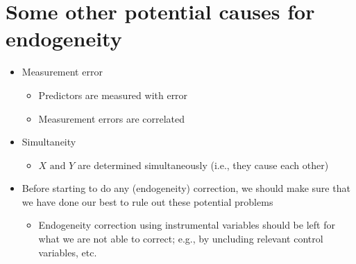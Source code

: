 \documentclass[10pt]{article}
\begin{document}
\section{Some other potential causes for endogeneity}
\begin{itemize}
    \item Measurement error
    \begin{itemize}
        \item Predictors are measured with error 
        \item Measurement errors are correlated 
    \end{itemize}
    \item Simultaneity
    \begin{itemize}
        \item $X \text{ and } Y $ are determined simultaneously (i.e., they cause each other)
    \end{itemize}
    \item Before starting to do any (endogeneity) correction, we should make sure that we have done our best to rule out these potential problems 
    \begin{itemize}
        \item Endogeneity correction using instrumental variables should be left for what we are not able to correct; e.g., by uncluding relevant control variables, etc. 
    \end{itemize}
\end{itemize}
\end{document}
